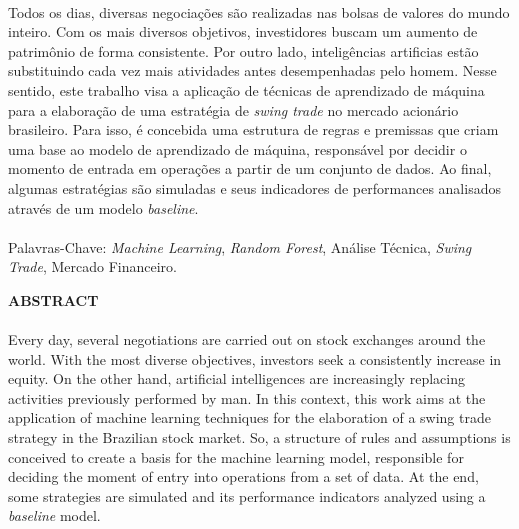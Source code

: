 \paragraph{} Todos os dias, diversas negociações são realizadas nas bolsas de valores do mundo inteiro. Com os mais diversos objetivos, investidores buscam um aumento de patrimônio de forma consistente. Por outro lado, inteligências artificias estão substituindo cada vez mais atividades antes desempenhadas pelo homem. Nesse sentido, este trabalho visa a aplicação de técnicas de aprendizado de máquina para a elaboração de uma estratégia de \textit{swing trade} no mercado acionário brasileiro. Para isso, é concebida uma estrutura de regras e premissas que criam uma base ao modelo de aprendizado de máquina, responsável por decidir o momento de entrada em operações a partir de um conjunto de dados. Ao final, algumas estratégias são simuladas e seus indicadores de performances analisados através de um modelo \textit{baseline}.

\paragraph{}
\noindent Palavras-Chave: \textit{Machine Learning}, \textit{Random Forest}, Análise Técnica, \textit{Swing Trade}, Mercado Financeiro.

\pagebreak


\begin{center}
\textbf{ABSTRACT}
\end{center}
      \vspace{0.5cm}

\paragraph{} Every day, several negotiations are carried out on stock exchanges around the world. With the most diverse objectives, investors seek a consistently increase in equity. On the other hand, artificial intelligences are increasingly replacing activities previously performed by man. In this context, this work aims at the application of machine learning techniques for the elaboration of a swing trade strategy in the Brazilian stock market. So, a structure of rules and assumptions is conceived to create a basis for the machine learning model, responsible for deciding the moment of entry into operations from a set of data. At the end, some strategies are simulated and its performance indicators analyzed using a \textit{baseline} model.

